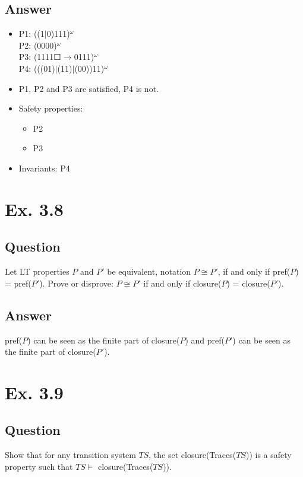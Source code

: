 \documentclass[12pt]{article}
\begin{document}
\subsection*{Answer}
\begin{itemize}
	\item P1: ((1$|$0)111)$^\omega$\\
			P2: (0000)$^\omega$\\
			P3: (1111$\Square\rightarrow$0111)$^\omega$\\
			P4: (((01)$|$(11)$|$(00))11)$^\omega$
	\item P1, P2 and P3 are satisfied, P4 is not.
	\item Safety properties:
		\begin{itemize}
			\item P2\\
			\item P3\\
		\end{itemize}
	\item Invariants: P4
\end{itemize}

\newpage
\section*{Ex. 3.8}
\subsection*{Question}
Let LT properties $P$ and $P'$ be equivalent, notation $P \cong P'$, if and only if
pref($P$) = pref($P'$). Prove or disprove: $P \cong P'$ if and only if closure($P$) = closure($P'$).

\subsection*{Answer}
pref($P$) can be seen as the finite part of closure($P$) and pref($P'$) can be seen as the finite part of closure($P'$). 


\section*{Ex. 3.9}
\subsection*{Question}
Show that for any transition system $TS$, the set closure(Traces($TS$)) is a safety
property such that $TS \models $ closure(Traces($TS$)).
\end{document}
